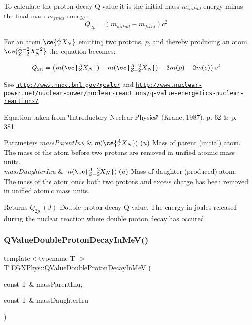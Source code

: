 To calculate the proton decay Q-\/value it is the initial mass $m_{initial}$ energy minus the final mass $m_{final}$ energy\+: \[Q_{2p} = \left ( m_{initial}-m_{final}\right ) c^2\]

For an atom $\ce{ ^{A}_{Z}X_{N} }$ emitting two protons, $p$, and thereby producing an atom $\ce{ ^{A-2}_{Z-2}X^{-2}_{N} }$ the equation becomes\+:

\[Q_{2n} = \left ( m(\ce{ ^{A}_{Z}X_{N} }) - m(\ce{ ^{A-2}_{Z-2}X_{N} }) - 2m(p) - 2m(e)\right ) c^2\]

See \href{http://www.nndc.bnl.gov/qcalc/}{\tt http\+://www.\+nndc.\+bnl.\+gov/qcalc/} and \href{http://www.nuclear-power.net/nuclear-power/nuclear-reactions/q-value-energetics-nuclear-reactions/}{\tt http\+://www.\+nuclear-\/power.\+net/nuclear-\/power/nuclear-\/reactions/q-\/value-\/energetics-\/nuclear-\/reactions/}

Equation taken from \char`\"{}\+Introductory Nuclear Physics\char`\"{} (Krane, 1987), p. 62 \& p. 381


\begin{DoxyParams}{Parameters}
{\em mass\+Parent\+Inu} & $m(\ce{ ^{A}_{Z}X_{N} })\ (u)$ Mass of parent (initial) atom. The mass of the atom before two protons are removed in unified atomic mass units. \\
\hline
{\em mass\+Daughter\+Inu} & $m(\ce{ ^{A-2}_{Z-2}X_{N} })\ (u)$ Mass of daughter (produced) atom. The mass of the atom once both two protons and excess charge has been removed in unified atomic mass units. \\
\hline
\end{DoxyParams}
\begin{DoxyReturn}{Returns}
$Q_{2p}\ (J)$ Double proton decay Q-\/value. The energy in joules released during the nuclear reaction where double proton decay has occured. 
\end{DoxyReturn}
\mbox{\label{group___q_value_ga4a57c8901e92918f08bee52493b81c59}} 
\subsubsection{\texorpdfstring{Q\+Value\+Double\+Proton\+Decay\+In\+Me\+V()}{QValueDoubleProtonDecayInMeV()}}
{\footnotesize\ttfamily template$<$typename T $>$ \\
T E\+G\+X\+Phys\+::\+Q\+Value\+Double\+Proton\+Decay\+In\+MeV (\begin{DoxyParamCaption}\item[{const T \&}]{mass\+Parent\+Inu,  }\item[{const T \&}]{mass\+Daughter\+Inu }\end{DoxyParamCaption})}



